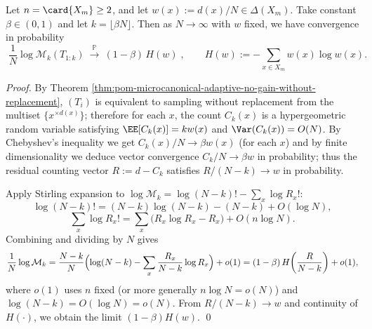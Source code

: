 \begin{theorem}\label{thm:pom-microcanonical-posterior-entropy-linear-law}
Let \(n=\card{X_m}\ge 2\), and let \(w(x):=d(x)/N\in\Delta(X_m)\).
Take constant \(\beta\in(0,1)\) and let \(k=\lfloor \beta N\rfloor\).
Then as \(N\to\infty\) with \(w\) fixed, we have convergence in probability
\[
\boxed{\;
\frac{1}{N}\log \mathcal{M}_k(T_{1:k})
\ \xrightarrow{\ \mathbb{P}\ }\ (1-\beta)\,H(w)\;},
\qquad
H(w):=-\sum_{x\in X_m}w(x)\log w(x).
\]
\end{theorem}
\begin{proof}
By Theorem \ref{thm:pom-microcanonical-adaptive-no-gain-without-replacement},
\((T_i)\) is equivalent to sampling without replacement from the multiset \(\{x^{\times d(x)}\}\);
therefore for each \(x\), the count \(C_k(x)\) is a hypergeometric random variable satisfying
\(
\EE[C_k(x)]=kw(x)
\)
and \(\Var(C_k(x))=O(N)\).
By Chebyshev's inequality we get
\(
C_k(x)/N\to \beta w(x)
\)
(for each \(x\)) and by finite dimensionality we deduce vector convergence \(C_k/N\to \beta w\) in probability;
thus the residual counting vector
\(
R:=d-C_k
\)
satisfies
\(
R/(N-k)\to w
\)
in probability.
\par
Apply Stirling expansion to \(\log\mathcal{M}_k=\log(N-k)!-\sum_x\log R_x!\):
\[
\log (N-k)!
=(N-k)\log(N-k)-(N-k)+O(\log N),
\]
\[
\sum_x\log R_x!
=\sum_x\bigl(R_x\log R_x-R_x\bigr)+O(n\log N).
\]
Combining and dividing by \(N\) gives
\[
\frac{1}{N}\log\mathcal{M}_k
=\frac{N-k}{N}\Bigl(\log(N-k)-\sum_x \frac{R_x}{N-k}\log R_x\Bigr)+o(1)
=(1-\beta)\,H\!\left(\frac{R}{N-k}\right)+o(1),
\]
where \(o(1)\) uses \(n\) fixed (or more generally \(n\log N=o(N)\)) and \(\log(N-k)=O(\log N)=o(N)\).
From \(R/(N-k)\to w\) and continuity of \(H(\cdot)\), we obtain the limit \((1-\beta)H(w)\). \qed
\end{proof}


